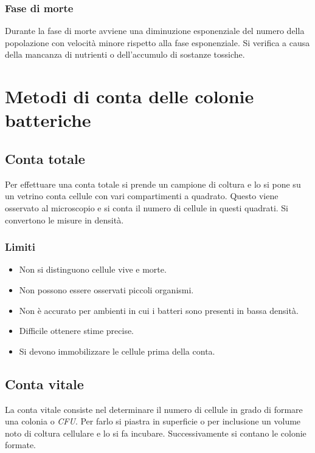 		\subsubsection{Fase di morte}
		Durante la fase di morte avviene una diminuzione esponenziale del numero della popolazione con velocit\`a minore rispetto alla fase esponenziale.
		Si verifica a causa della mancanza di nutrienti o dell'accumulo di sostanze tossiche.

\section{Metodi di conta delle colonie batteriche}
	
	\subsection{Conta totale}
	Per effettuare una conta totale si prende un campione di coltura e lo si pone su un vetrino conta cellule con vari compartimenti a quadrato.
	Questo viene osservato al microscopio e si conta il numero di cellule in questi quadrati.
	Si convertono le misure in densit\`a.
		
		\subsubsection{Limiti}
		\begin{multicols}{2}
			\begin{itemize}
				\item Non si distinguono cellule vive e morte.
				\item Non possono essere osservati piccoli organismi.
				\item Non \`e accurato per ambienti in cui i batteri sono presenti in bassa densit\`a.
				\item Difficile ottenere stime precise.
				\item Si devono immobilizzare le cellule prima della conta.
			\end{itemize}
		\end{multicols}

	\subsection{Conta vitale}
	La conta vitale consiste nel determinare il numero di cellule in grado di formare una colonia o \emph{CFU}.
	Per farlo si piastra in superficie o per inclusione un volume noto di coltura cellulare e lo si fa incubare.
	Successivamente si contano le colonie formate.

